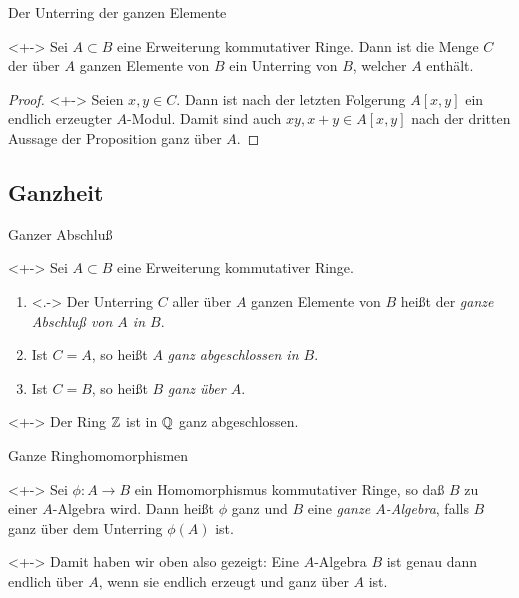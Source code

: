 \begin{frame}{Der Unterring der ganzen Elemente}
	\begin{corollary}<+->
		Sei \(A \subset B\) eine Erweiterung kommutativer Ringe. Dann ist
		die Menge \(C\) der über \(A\) ganzen Elemente von \(B\) ein Unterring
		von \(B\), welcher \(A\) enthält.
	\end{corollary}
	\begin{proof}<+->
		Seien \(x, y \in C\). Dann ist nach der letzten Folgerung \(A[x, y]\)
		ein endlich erzeugter \(A\)-Modul. Damit sind auch
		\(xy, x + y \in A[x, y]\) nach der dritten Aussage der Proposition
		ganz über \(A\). 
	\end{proof}
\end{frame}

\subsection{Ganzheit}

\begin{frame}{Ganzer Abschluß}
	\begin{definition}<+->
		Sei \(A \subset B\) eine Erweiterung kommutativer Ringe.
		\begin{enumerate}[<+->]
		\item<.->
			Der Unterring \(C\) aller über \(A\) ganzen Elemente von \(B\) heißt der
			\emph{ganze Abschluß von \(A\) in \(B\)}.
		\item
			Ist \(C = A\), so heißt \(A\) \emph{ganz abgeschlossen in \(B\)}.
		\item
			Ist \(C = B\), so heißt \(B\) \emph{ganz über \(A\)}.
		\end{enumerate}
	\end{definition}
	\begin{example}<+->
		Der Ring \(\mathbb Z\) ist in \(\mathbb Q\) ganz abgeschlossen.
	\end{example}
\end{frame}

\begin{frame}{Ganze Ringhomomorphismen}
	\begin{definition}<+->
		Sei \(\phi\colon A \to B\) ein Homomorphismus kommutativer Ringe, so daß
		\(B\) zu einer \(A\)-Algebra wird. Dann heißt \(\phi\) ganz und \(B\)
		eine \emph{ganze \(A\)-Algebra}, falls \(B\) ganz über dem Unterring
		\(\phi(A)\) ist.
	\end{definition}
	\begin{visibleenv}<+->
		Damit haben wir oben also gezeigt: Eine \(A\)-Algebra \(B\) ist genau
		dann endlich über \(A\), wenn sie endlich erzeugt und ganz über \(A\)
		ist.
	\end{visibleenv}	
\end{frame}

